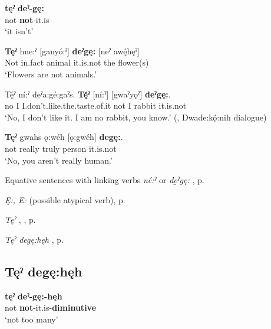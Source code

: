 \ea
\label{ex:tpart22}
\gll \textbf{tęˀ} \textbf{deˀ-gę:}\\
not \textbf{not}-it.is\\
\glt ‘it isn’t’
\z

\ea
\label{ex:tpart23}
\gll \textbf{Tęˀ} hne:ˀ [ganyó:ˀ] \textbf{deˀgę:} [neˀ awę́hęˀ]\\
Not in.fact animal it.is.not the flower(s)\\
\glt ‘Flowers are not animals.’
\z

\ea
\label{ex:tpart24}
\gll Tę́ˀ ní:ˀ de̱ˀa:gé:gaˀs. \textbf{Tę́ˀ} [ní:ˀ] [gwaˀyǫˀ] \textbf{deˀgę:}.\\
no I I.don’t.like.the.taste.of.it not I rabbit it.is.not\\
\glt ‘No, I don’t like it. I am no rabbit, you know.’ (\cite[294]{mithun_watewayestanih_1984}, Dwade:kǫ́:nih dialogue)
\z


\ea
\label{ex:tpart25}
\gll \textbf{Tęˀ} gwahs ǫ:wéh [ǫ:gwéh] \textbf{degę:}.\\
not really truly person it.is.not\\
\glt ‘No, you aren’t really human.’
\z

\begin{CayugaRelated}
\item Equative sentences with linking verbs \textit{né:ˀ}  or \textit{de̱ˀgę:} , p. \pageref{Equative sentences with linking verbs [né:ˀ], [deˀgę:]}\\
\item \textit{Ę:, E:} (possible atypical verb), p. \pageref{p:[ę:, e:] `atypical verb’}\\
\item \textit{Tęˀ} , , p. \pageref{p:[tęˀ]}\\
\item \textit{Tęˀ degę:hęh} , p. \pageref{p:[tęˀ degę:hęh]}
\end{CayugaRelated}

\subsection*{\textbf{Tęˀ degę:hęh} } \label{p:[tęˀ degę:hęh]}

\ea
\label{ex:tpart26}
\gll \textbf{tęˀ} \textbf{deˀ-gę:-hęh}\\
not \textbf{not}-it.is-\textbf{diminutive}\\
\glt ‘not too many’
\z

